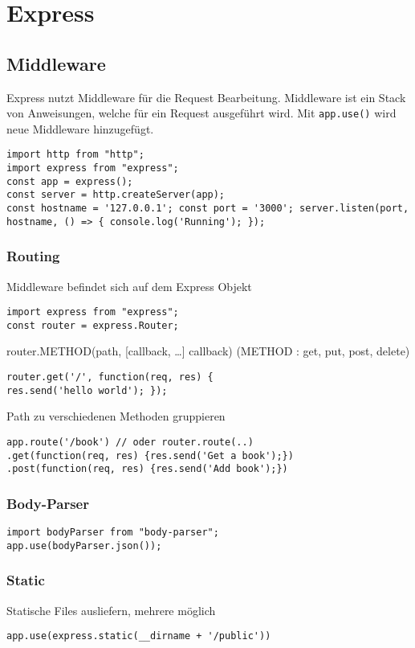 
\section{Express}


\subsection{Middleware}
Express nutzt Middleware für die Request Bearbeitung. Middleware ist ein Stack von Anweisungen, welche für ein Request ausgeführt wird. Mit \texttt{app.use()} wird neue Middleware hinzugefügt.
\begin{lstlisting}
import http from "http";
import express from "express";
const app = express();
const server = http.createServer(app);
const hostname = '127.0.0.1'; const port = '3000'; server.listen(port, hostname, () => { console.log('Running'); });
\end{lstlisting}

\subsubsection{Routing}
Middleware befindet sich auf dem Express Objekt
\begin{lstlisting}
import express from "express";
const router = express.Router;
\end{lstlisting}
router.METHOD(path, [callback, \dots ] callback)  (METHOD : get, put, post, delete)
\begin{lstlisting}
router.get('/', function(req, res) {
res.send('hello world'); });
\end{lstlisting}
Path zu verschiedenen Methoden gruppieren
\begin{lstlisting}
app.route('/book') // oder router.route(..)
.get(function(req, res) {res.send('Get a book');})
.post(function(req, res) {res.send('Add book');})
\end{lstlisting}

\subsubsection{Body-Parser}
\begin{lstlisting}
import bodyParser from "body-parser";
app.use(bodyParser.json());
\end{lstlisting}

\subsubsection{Static}
Statische Files ausliefern, mehrere möglich
\begin{lstlisting}
app.use(express.static(__dirname + '/public'))
\end{lstlisting}

